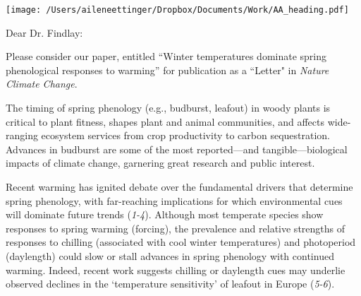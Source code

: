 \documentclass[10.5pt,a4paper]{letter}
\begin{document}

\begin{letter}{}
\texttt{[image: /Users/aileneettinger/Dropbox/Documents/Work/AA\_heading.pdf]}

\opening{Dear Dr. Findlay:}
Please consider our paper, entitled ``Winter temperatures dominate spring phenological responses to warming'' for publication as a ``Letter" in \emph{Nature Climate Change}. 

The timing of spring phenology (e.g., budburst, leafout) in woody plants is critical to plant fitness, shapes plant and animal communities, and affects wide-ranging ecosystem services from crop productivity to carbon sequestration. 
Advances in budburst are some of the most reported---and tangible---biological impacts of climate change, garnering great research and public interest. 

\par Recent warming has ignited debate over the fundamental drivers that determine spring phenology, with far-reaching implications for which environmental cues will dominate future trends  (\emph{1-4}). Although most temperate species show responses to spring warming (forcing), the prevalence and relative strengths of responses to chilling (associated with cool winter temperatures) and photoperiod (daylength) could slow or stall advances in spring phenology with continued warming. Indeed, recent work suggests chilling or daylength cues may underlie observed declines in the `temperature sensitivity' of leafout in Europe (\emph{5-6}). 


\end{letter}
\end{document}
